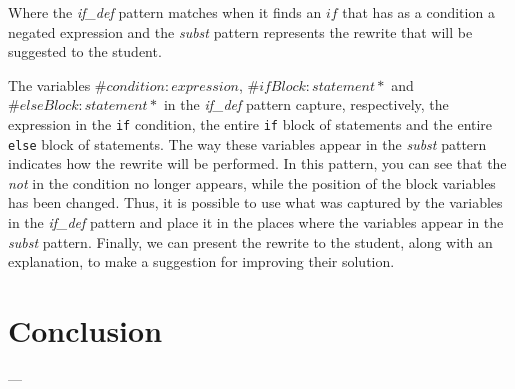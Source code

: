 Where the \textit{if\_def} pattern matches when it finds an \(if\) that has as 
a condition a negated expression and the \textit{subst} pattern represents the 
rewrite that will be suggested to the student.

The variables \(\#condition:expression\), \(\#ifBlock:statement*\) and \(\#elseBlock:statement*\)
in the \textit{if\_def} pattern capture, respectively, the expression in the
\texttt{if} condition, the entire \texttt{if} block of statements and the entire 
\texttt{else} block of statements.
The way these variables appear in the \textit{subst} pattern indicates how the 
rewrite will be performed. In this pattern, you can see that the \textit{not} 
in the condition no longer appears, while the position of the block variables 
has been changed. Thus, it is possible to use what was captured by the variables 
in the \textit{if\_def} pattern and place it in the places where the variables 
appear in the \textit{subst} pattern. 
Finally, we can present the rewrite to the student, along with an explanation, to 
make a suggestion for improving their solution.

\section{Conclusion}\label{sec:results-conclusion}

---

\cleardoublepage